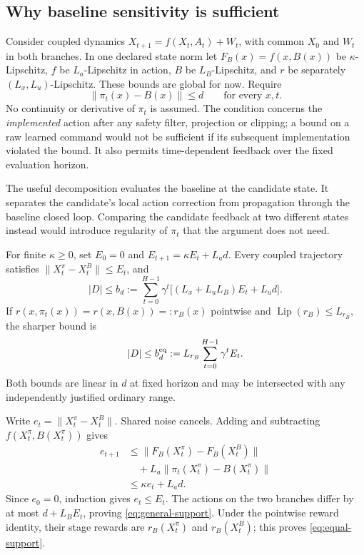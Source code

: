 \documentclass[twocolumn,nameyear]{autart}
\begin{document}
\subsection{Why baseline sensitivity is sufficient}
Consider coupled dynamics
$X_{t+1}=f(X_t,A_t)+W_t$, with common $X_0$ and $W_t$ in both branches.
In one declared state norm let $F_B(x)=f(x,B(x))$ be
$\kappa$-Lipschitz, $f$ be $L_a$-Lipschitz in action, $B$ be
$L_B$-Lipschitz, and $r$ be separately $(L_x,L_u)$-Lipschitz.
These bounds are global for now. Require
\begin{equation}\label{eq:displacement}
 \|\pi_t(x)-B(x)\|\le d\qquad\text{for every }x,t.
\end{equation}
No continuity or derivative of $\pi_t$ is assumed.
The condition concerns the \emph{implemented} action after any safety
filter, projection or clipping; a bound on a raw learned command would
not be sufficient if its subsequent implementation violated the bound.
It also permits time-dependent feedback over the fixed evaluation horizon.

The useful decomposition evaluates the baseline at the candidate state.
It separates the candidate's local action correction from propagation
through the baseline closed loop. Comparing the candidate feedback at
two different states instead would introduce regularity of $\pi_t$
that the argument does not need.

\begin{thm}\label{thm:support}
For finite $\kappa\ge0$, set
$E_0=0$ and $E_{t+1}=\kappa E_t+L_ad$. Every coupled trajectory satisfies
$\|X_t^\pi-X_t^B\|\le E_t$, and
\begin{equation}\label{eq:general-support}
 |D|\le b_d:=\sum_{t=0}^{H-1}\gamma^t
       \bigl[(L_x+L_uL_B)E_t+L_ud\bigr].
\end{equation}
If $r(x,\pi_t(x))=r(x,B(x))=:r_B(x)$ pointwise and
$\operatorname{Lip}(r_B)\le L_{r_B}$, the sharper bound is
\begin{equation}\label{eq:equal-support}
 |D|\le b_d^{\rm eq}:=L_{r_B}\sum_{t=0}^{H-1}\gamma^t E_t.
\end{equation}
Both bounds are linear in $d$ at fixed horizon and may be intersected
with any independently justified ordinary range.
\end{thm}
\begin{pf}
Write $e_t=\|X_t^\pi-X_t^B\|$. Shared noise cancels. Adding and
subtracting $f(X_t^\pi,B(X_t^\pi))$ gives
\begin{align*}
 e_{t+1}&\le\|F_B(X_t^\pi)-F_B(X_t^B)\|\\
 &\quad+L_a\|\pi_t(X_t^\pi)-B(X_t^\pi)\|\\
 &\le\kappa e_t+L_ad.
\end{align*}
Since $e_0=0$, induction gives $e_t\le E_t$. The actions on the two
branches differ by at most $d+L_BE_t$, proving
\eqref{eq:general-support}. Under the pointwise reward identity, their
stage rewards are $r_B(X_t^\pi)$ and $r_B(X_t^B)$; this proves
\eqref{eq:equal-support}.
\end{pf}
\end{document}
